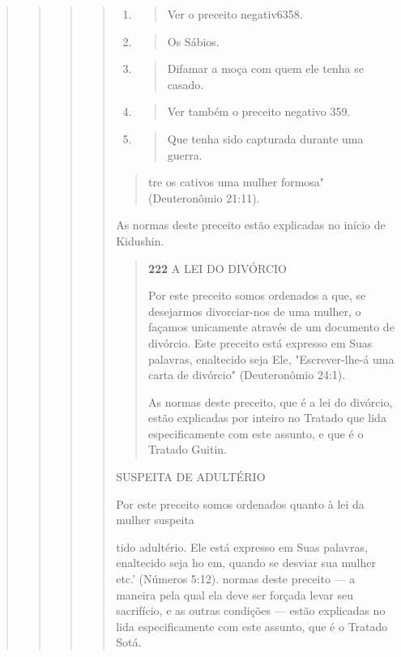 \begin{quote}
\begin{quote}
\begin{quote}
\begin{quote}
\begin{enumerate}
\def\labelenumi{\arabic{enumi}.}
\setcounter{enumi}{216}
\item
 \begin{quote}
 Ver o preceito negativ6358.
 \end{quote}
\item
 \begin{quote}
 Os Sábios.
 \end{quote}
\item
 \begin{quote}
 Difamar a moça com quem ele tenha se casado.
 \end{quote}
\item
 \begin{quote}
 Ver também o preceito negativo 359.
 \end{quote}
\item
 \begin{quote}
 Que tenha sido capturada durante uma guerra.
 \end{quote}
\end{enumerate}

\begin{quote}


tre os cativos uma mulher formosa" (Deuteronômio 21:11).
\end{quote}

As normas deste preceito estão explicadas no início de Kidushin.

\begin{quote}
\textbf{222} A LEI DO DIVÓRCIO

Por este preceito somos ordenados a que, se desejarmos divorciar-nos de
uma mulher, o façamos unicamente através de um documento de divór­cio.
Este preceito está expresso em Suas palavras, enaltecido seja Ele,
"Escrever-lhe-á uma carta de divórcio" (Deuteronômio 24:1).

As normas deste preceito, que é a lei do divórcio, estão explicadas por
inteiro no Tratado que lida especificamente com este assunto, e que é o
Tratado Guitin.
\end{quote}

SUSPEITA DE ADULTÉRIO

Por este preceito somos ordenados quanto à lei da mulher suspeita

tido adultério. Ele está expresso em Suas palavras, enaltecido seja ho
em, quando se desviar sua mulher etc.' (Números 5:12). normas deste
preceito --- a maneira pela qual ela deve ser forçada levar seu
sacrifício, e as outras condições --- estão explicadas no lida
especificamente com este assunto, que é o Tratado Sotá.


\end{quote}
\end{quote}
\end{quote}
\end{quote}

